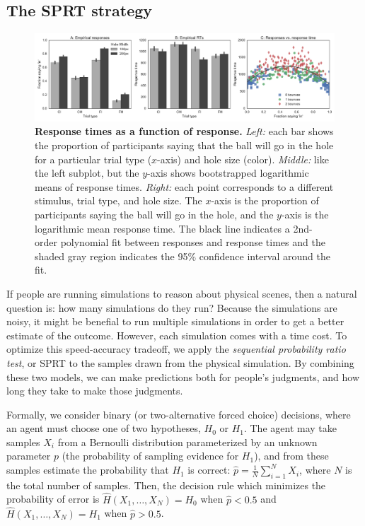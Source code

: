 \documentclass[10pt,letterpaper]{article}
\begin{document}
\subsection{The SPRT strategy}

\begin{figure}[t]
    \begin{center}
        \includegraphics[width=\textwidth]{figures/hole_empirical_results.pdf}
        \caption{\textbf{Response times as a function of response.} \emph{Left:} each bar shows the proportion of participants saying that the ball will go in the hole for a particular trial type ($x$-axis) and hole size (color). \emph{Middle:} like the left subplot, but the $y$-axis shows bootstrapped logarithmic means of response times. \emph{Right:} each point corresponds to a different stimulus, trial type, and hole size.  The $x$-axis is the proportion of participants saying the ball will go in the hole, and the $y$-axis is the logarithmic mean response time. The black line indicates a 2nd-order polynomial fit between responses and response times and the shaded gray region indicates the 95\% confidence interval around the fit.}
        \label{fig:pct-vs-rt}
    \end{center}
\end{figure}

If people are running simulations to reason about physical scenes, then a natural question is: how many simulations do they run?
Because the simulations are noisy, it might be benefial to run multiple simulations in order to get a better estimate of the outcome.
However, each simulation comes with a time cost.
To optimize this speed-accuracy tradeoff, we apply the \emph{sequential probability ratio test}, or SPRT \cite{wald1947sequential} to the samples drawn from the physical simulation.
By combining these two models, we can make predictions both for people's judgments, and how long they take to make those judgments.

Formally, we consider binary (or two-alternative forced choice) decisions, where an agent must choose one of two hypotheses, $H_0$ or $H_1$. 
The agent may take samples $X_i$ from a Bernoulli distribution parameterized by an unknown parameter $p$ (the probability of sampling evidence for $H_1$), and from these samples estimate the probability that $H_1$ is correct: $\hat{p}=\frac{1}{N}\sum_{i=1}^N X_i$, where $N$ is the total number of samples. 
Then, the decision rule which minimizes the probability of error is $\hat{H}(X_1,\ldots{},X_N)=H_0$ when $\hat{p}<0.5$ and $\hat{H}(X_1,\ldots{},X_N)=H_1$ when $\hat{p}>0.5$.
\end{document}
